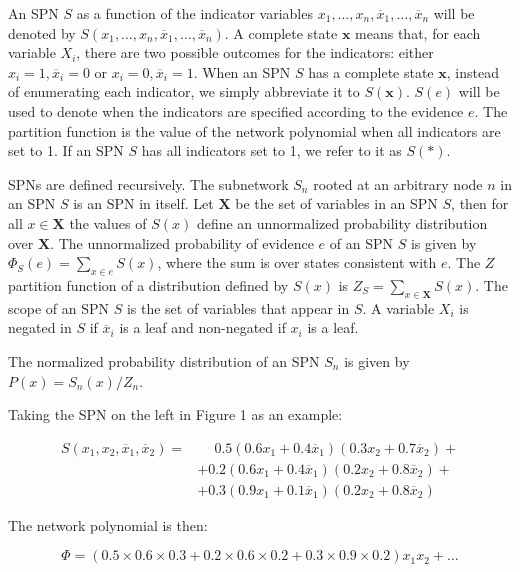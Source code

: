 \documentclass[a4paper,10pt]{article}
\theoremstyle{plain}
\begin{document}
An SPN $S$ as a function of the indicator variables $x_1,\ldots,x_n,\overline{x}_1,\ldots,
\overline{x}_n$ will be denoted by $S(x_1,\ldots,x_n,\overline{x}_1,\ldots,\overline{x}_n)$. A
complete state $\mathbf{x}$ means that, for each variable $X_i$, there are two possible outcomes
for the indicators: either $x_i=1,\overline{x}_i=0$ or $x_i=0,\overline{x}_i=1$. When an SPN $S$
has a complete state $\mathbf{x}$, instead of enumerating each indicator, we simply abbreviate it
to $S(\mathbf{x})$. $S(e)$ will be used to denote when the indicators are specified according to
the evidence $e$. The partition function is the value of the network polynomial when all indicators
are set to 1. If an SPN $S$ has all indicators set to 1, we refer to it as $S(*)$.

SPNs are defined recursively. The subnetwork $S_n$ rooted at an arbitrary node $n$ in an SPN $S$
is an SPN in itself. Let $\mathbf{X}$ be the set of variables in an SPN $S$, then for all $x\in
\mathbf{X}$ the values of $S(x)$ define an unnormalized probability distribution over $\mathbf{X}$.
The unnormalized probability of evidence $e$ of an SPN $S$ is given by $\Phi_S(e)=\sum_{x\in e}
S(x)$, where the sum is over states consistent with $e$. The $Z$ partition function of a
distribution defined by $S(x)$ is $Z_S=\sum_{x\in \mathbf{X}}S(x)$. The scope of an SPN $S$ is the
set of variables that appear in $S$. A variable $X_i$ is negated in $S$ if $\overline{x}_i$ is a
leaf and non-negated if $x_i$ is a leaf.

The normalized probability distribution of an SPN $S_n$ is given by $P(x)=S_n(x)/Z_n$.

Taking the SPN on the left in Figure 1 as an example:

\begin{align*}
  S(x_1,x_2,\overline{x}_1,\overline{x}_2)=&\phantom{{} +{}}0.5(0.6x_1+0.4\overline{x}_1)(0.3x_2+0.7\overline{x}_2)+\\
                                           &+0.2(0.6x_1+0.4\overline{x}_1)(0.2x_2+0.8\overline{x}_2)+\\
                                           &+0.3(0.9x_1+0.1\overline{x}_1)(0.2x_2+0.8\overline{x}_2)
\end{align*}

The network polynomial is then:

\begin{equation*}
  \Phi = (0.5\times0.6\times0.3+0.2\times0.6\times0.2+0.3\times0.9\times0.2)x_1x_2+\ldots
\end{equation*}
\end{document}
